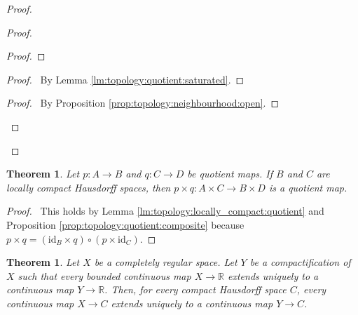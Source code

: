 \documentclass{report}
\let\qed\relax
\newtheorem{thm}[lm]{Theorem}
\theoremstyle{definition}
\newcommand{\id}[1]{\ensuremath{\mathrm{id}_{#1}}}
\newcommand{\inv}[1]{\ensuremath{{#1}^{-1}}}
\begin{document}
\begin{proof}
\begin{proof}
\begin{proof}
       \step{<3>3}{$b \in \inv{p}(p(U_n))$}
     \end{proof}
     \begin{proof}
       \pf\ By Lemma \ref{lm:topology:quotient:saturated}.
     \end{proof}
     \qedstep
     \begin{proof}
       \pf\ By Proposition \ref{prop:topology:neighbourhood:open}.
     \end{proof}
   \end{proof}
   \qed
  \end{proof}

    \begin{thm}
   Let $p : A \rightarrow B$ and $q : C \rightarrow D$ be quotient maps. If $B$
and $C$ are locally compact Hausdorff spaces, then $p \times q : A \times C
\rightarrow B \times D$ is a quotient map.
  \end{thm}

  \begin{proof}
    \pf\ This holds by Lemma
\ref{lm:topology:locally_compact:quotient} and Proposition
\ref{prop:topology:quotient:composite} because $p \times q = (\id{B} \times q)
\circ (p \times
\id{C})$. \qed
  \end{proof}

  \begin{thm}
    Let $X$ be a completely regular space. Let $Y$ be a compactification of $X$ such that every bounded continuous map $X \rightarrow \mathbb{R}$
    extends uniquely to a continuous map $Y \rightarrow \mathbb{R}$. Then, for every compact Hausdorff space $C$, every continuous map $X \rightarrow C$ extends uniquely to a continuous map $Y \rightarrow C$.
  \end{thm}
\end{document}
